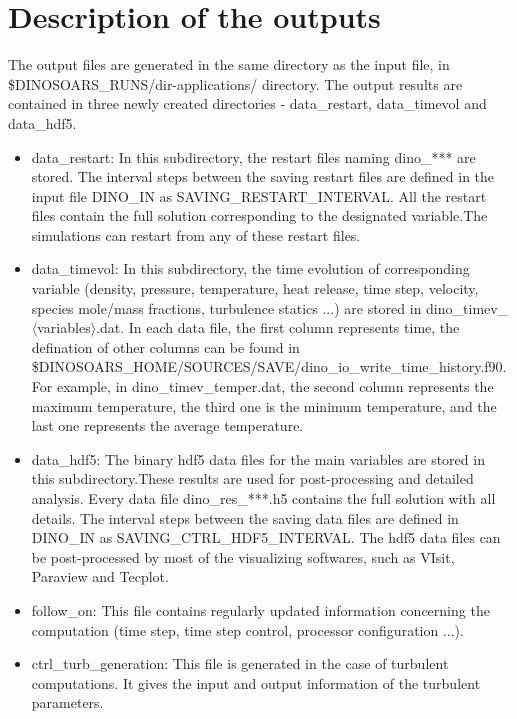 \section{Description of the outputs}
\label{output}
The output files are generated in the same directory as the input file, in \$DINOSOARS\_RUNS/dir-applications/ directory. The output results are contained in three newly created directories - data\_restart, data\_timevol and data\_hdf5.
\begin{itemize}
\item data\_restart: In this subdirectory, the restart files naming dino\_*** are stored. The interval steps between the saving restart files are defined in the input file DINO\_IN as SAVING\_RESTART\_INTERVAL. All the restart files contain the full solution corresponding to the designated variable.The simulations can restart from any of these restart files. 
\item data\_timevol: In this subdirectory, the time evolution of corresponding variable (density, pressure, temperature, heat release, time step, velocity, species mole/mass fractions, turbulence statics ...) are stored in dino\_timev\_{$\langle$variables$\rangle$}.dat. In each data file, the first column represents time, the defination of other columns can be found in \$DINOSOARS\_HOME/SOURCES/SAVE/dino\_io\_write\_time\_history.f90. For example, in dino\_timev\_temper.dat, the second column represents the maximum temperature, the third one is the minimum temperature, and the last one represents the average temperature.
\item data\_hdf5: The binary hdf5 data files for the main variables are stored in this subdirectory.These results are used for post-processing and detailed analysis. Every data file dino\_res\_***.h5 contains the full solution with all details. The interval steps between the saving data files are defined in DINO\_IN as SAVING\_CTRL\_HDF5\_INTERVAL. The hdf5 data files can be post-processed by most of the visualizing softwares, such as VIsit, Paraview and Tecplot.
\item follow\_on: This file contains regularly updated information concerning the computation (time step, time step control, processor configuration ...).
\item ctrl\_turb\_generation: This file is generated in the case of turbulent computations. It gives the input and output information of the turbulent parameters.
\end{itemize} 

